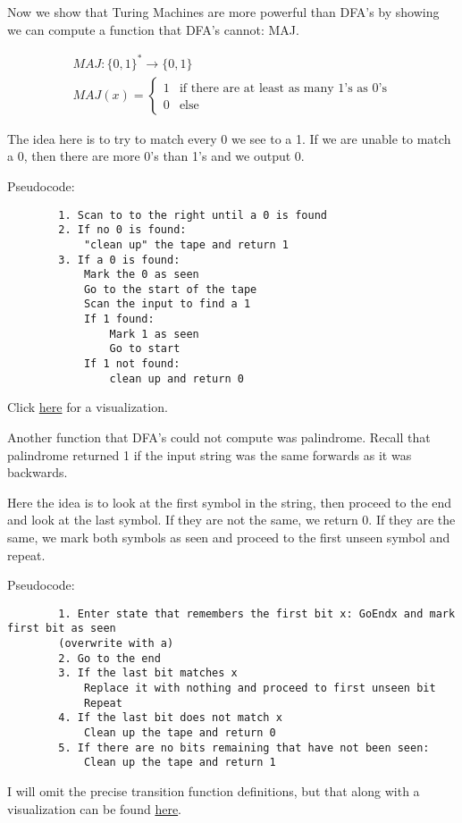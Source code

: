 \begin{example}
    Now we show that Turing Machines are more powerful than DFA's by showing we can compute a function that DFA's cannot: MAJ.

    \begin{gather*}
        MAJ:\{0, 1\}^* \rightarrow \{0, 1\} \\
        MAJ(x) = 
        \begin{cases}
            1 & \text{if there are at least as many 1's as 0's} \\
            0 & \text{else}
        \end{cases}
    \end{gather*}
    
    The idea here is to try to match every 0 we see to a 1. If we are unable to match a 0, then there are more 0's than 1's and we output 0. 
    
    Pseudocode:
    \begin{verbatim}
        1. Scan to to the right until a 0 is found
        2. If no 0 is found:
            "clean up" the tape and return 1
        3. If a 0 is found:
            Mark the 0 as seen 
            Go to the start of the tape
            Scan the input to find a 1
            If 1 found:
                Mark 1 as seen
                Go to start
            If 1 not found:
                clean up and return 0
    \end{verbatim}
    
    Click \href{http://turingmachinesimulator.com/shared/ftcgvwwbaj}{here} for a visualization.   
\end{example}

\begin{example}
    Another function that DFA's could not compute was palindrome. Recall that palindrome returned 1 if the input string was the same forwards as it was backwards.

    Here the idea is to look at the first symbol in the string, then proceed to the end and look at the last symbol. If they are not the same, we return 0. If they are the same, we mark both symbols as seen and proceed to the first unseen symbol and repeat. 

    Pseudocode:
    \begin{verbatim}
        1. Enter state that remembers the first bit x: GoEndx and mark first bit as seen 
        (overwrite with a)
        2. Go to the end
        3. If the last bit matches x 
            Replace it with nothing and proceed to first unseen bit
            Repeat
        4. If the last bit does not match x
            Clean up the tape and return 0
        5. If there are no bits remaining that have not been seen:
            Clean up the tape and return 1
    \end{verbatim}

    I will omit the precise transition function definitions, but that along with a visualization can be found \href{http://turingmachinesimulator.com/shared/mngibtvnaj}{here}. 
\end{example}

